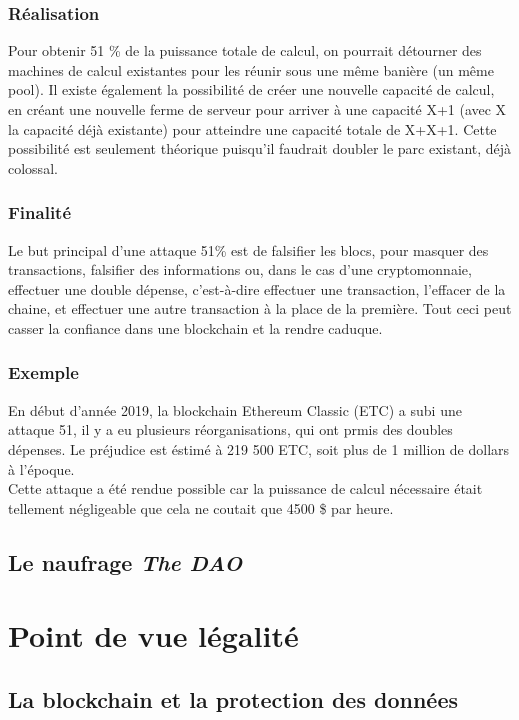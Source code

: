 \documentclass[12pt, a4paper, oneside]{book}
\begin{document}
    \subsection{Réalisation}
    Pour obtenir 51 \% de la puissance totale de calcul, on pourrait détourner des machines de calcul existantes pour les réunir sous une même banière (un même pool).
    Il existe également la possibilité de créer une nouvelle capacité de calcul, en créant une nouvelle ferme de serveur pour arriver à une capacité X+1 (avec X la capacité déjà existante) pour atteindre une capacité totale de X+X+1. Cette possibilité est seulement théorique puisqu'il faudrait doubler le parc existant, déjà colossal.
    \subsection{Finalité}
    Le but principal d'une attaque 51\% est de falsifier les blocs, pour masquer des transactions, falsifier des informations ou, dans le cas d'une cryptomonnaie, effectuer une double dépense, c'est-à-dire effectuer une transaction, l'effacer de la chaine, et effectuer une autre transaction à la place de la première.
    \newline
    Tout ceci peut casser la confiance dans une blockchain et la rendre caduque.
    \subsection{Exemple}
    En début d'année 2019, la blockchain Ethereum Classic (ETC) a subi une attaque 51, il y a eu plusieurs réorganisations, qui ont prmis des doubles dépenses. Le préjudice est éstimé à 219 500 ETC, soit plus de 1 million de dollars à l'époque.
    \\
    Cette attaque a été rendue possible car la puissance de calcul nécessaire était tellement négligeable que cela ne coutait que 4500 \$ par heure.\cite{51ETC}

    \section{Le naufrage \emph{The DAO}}

    

    \chapter{Point de vue légalité}
    \section{La blockchain et la protection des données}
\end{document}
